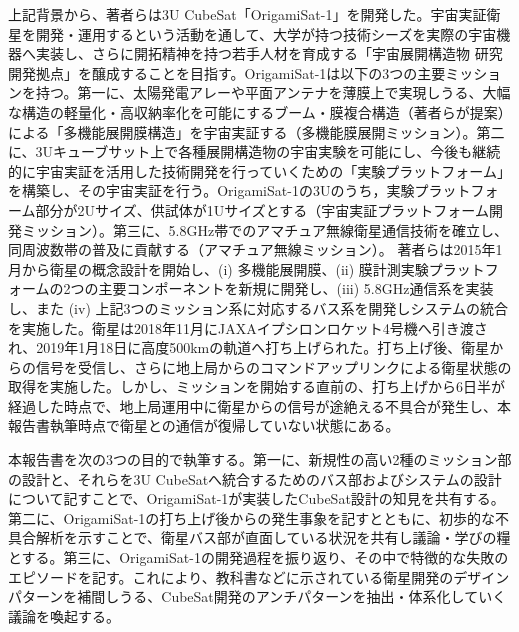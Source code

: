 上記背景から、著者らは3U CubeSat「OrigamiSat-1」を開発した。宇宙実証衛星を開発・運用するという活動を通して、大学が持つ技術シーズを実際の宇宙機器へ実装し、さらに開拓精神を持つ若手人材を育成する「宇宙展開構造物 研究開発拠点」を醸成することを目指す。OrigamiSat-1は以下の3つの主要ミッションを持つ。第一に、太陽発電アレーや平面アンテナを薄膜上で実現しうる、大幅な構造の軽量化・高収納率化を可能にするブーム・膜複合構造（著者らが提案）による「多機能展開膜構造」を宇宙実証する（多機能膜展開ミッション）。第二に、3Uキューブサット上で各種展開構造物の宇宙実験を可能にし、今後も継続的に宇宙実証を活用した技術開発を行っていくための「実験プラットフォーム」を構築し、その宇宙実証を行う。OrigamiSat-1の3Uのうち，実験プラットフォーム部分が2Uサイズ、供試体が1Uサイズとする（宇宙実証プラットフォーム開発ミッション）。第三に、5.8GHz帯でのアマチュア無線衛星通信技術を確立し、同周波数帯の普及に貢献する（アマチュア無線ミッション）。
著者らは2015年1月から衛星の概念設計を開始し、(i) 多機能展開膜、(ii) 膜計測実験プラットフォームの2つの主要コンポーネントを新規に開発し、(iii) 5.8GHz通信系を実装し、また (iv) 上記3つのミッション系に対応するバス系を開発しシステムの統合を実施した。衛星は2018年11月にJAXAイプシロンロケット4号機へ引き渡され、2019年1月18日に高度500kmの軌道へ打ち上げられた。打ち上げ後、衛星からの信号を受信し、さらに地上局からのコマンドアップリンクによる衛星状態の取得を実施した。しかし、ミッションを開始する直前の、打ち上げから6日半が経過した時点で、地上局運用中に衛星からの信号が途絶える不具合が発生し、本報告書執筆時点で衛星との通信が復帰していない状態にある。


本報告書を次の3つの目的で執筆する。第一に、新規性の高い2種のミッション部の設計と、それらを3U CubeSatへ統合するためのバス部およびシステムの設計について記すことで、OrigamiSat-1が実装したCubeSat設計の知見を共有する。第二に、OrigamiSat-1の打ち上げ後からの発生事象を記すとともに、初歩的な不具合解析を示すことで、衛星バス部が直面している状況を共有し議論・学びの糧とする。第三に、OrigamiSat-1の開発過程を振り返り、その中で特徴的な失敗のエピソードを記す。これにより、教科書などに示されている衛星開発のデザインパターンを補間しうる、CubeSat開発のアンチパターンを抽出・体系化していく議論を喚起する。


